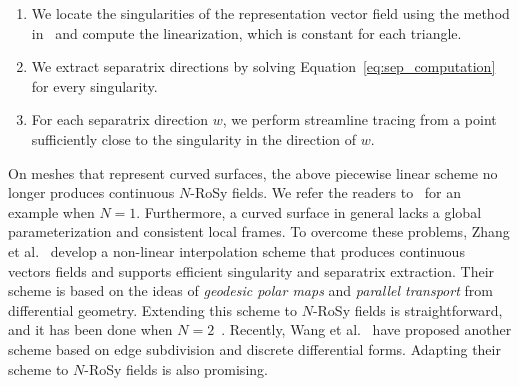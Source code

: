 \documentclass{acmsiggraph}               %
\begin{document}
\begin{enumerate}
\item We locate the singularities of the representation vector
field using the method in~\cite{Tricoche:02} and compute the
linearization, which is constant for each triangle.
\item We extract separatrix directions by solving
Equation~\ref{eq:sep_computation} for every singularity.
\item For each separatrix direction $w$, we perform
streamline tracing from a point sufficiently close to the
singularity in the direction of $w$.
\end{enumerate}

On meshes that represent curved surfaces, the above piecewise linear
scheme no longer produces continuous $N$-RoSy fields. We refer the
readers to~\cite{Zhang:06} for an example when $N=1$. Furthermore, a
curved surface in general lacks a global parameterization and
consistent local frames. To overcome these problems, Zhang et
al.~ develop a non-linear interpolation scheme
that produces continuous vectors fields and supports efficient
singularity and separatrix extraction. Their scheme is based on the
ideas of {\em geodesic polar maps} and {\em parallel transport} from
differential geometry. Extending this scheme to $N$-RoSy fields is
straightforward, and it has been done when $N=2$~\cite{Zhang:07}.
Recently, Wang et al.~ have proposed another
scheme based on edge subdivision and discrete differential forms.
Adapting their scheme to $N$-RoSy fields is also promising.
\end{document}
